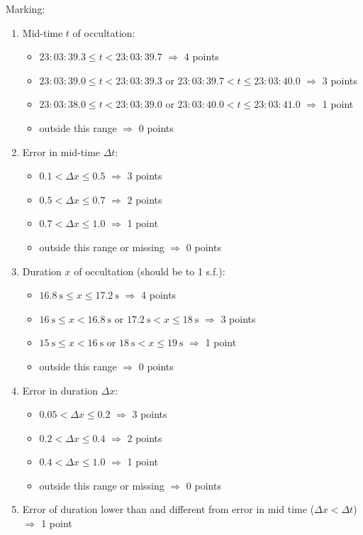 Marking:
\begin{enumerate}
\item Mid-time $t$ of occultation:
  \begin{itemize}
  \item $23{:}03{:}39.3 \le t < 23{:}03{:}39.7$ $\Longrightarrow$ 4 points
  \item $23{:}03{:}39.0 \le t < 23{:}03{:}39.3$ or
    $23{:}03{:}39.7 < t \le 23{:}03{:}40.0$ $\Longrightarrow$ 3 points
  \item $23{:}03{:}38.0 \le t < 23{:}03{:}39.0$ or
    $23{:}03{:}40.0 < t \le 23{:}03{:}41.0$ $\Longrightarrow$ 1 point
  \item outside this range $\Longrightarrow$ 0 points
  \end{itemize}
\item Error in mid-time $\Delta t$:
  \begin{itemize}
  \item $0.1 < \Delta x \le 0.5$ $\Longrightarrow$ 3 points
  \item $0.5 < \Delta x \le 0.7$ $\Longrightarrow$ 2 points
  \item $0.7 < \Delta x \le 1.0$ $\Longrightarrow$ 1 point
  \item outside this range or missing $\Longrightarrow$ 0 points
  \end{itemize}
\item Duration $x$ of occultation (should be to 1 s.f.):
  \begin{itemize}
  \item $16.8~\mathrm{s} \le x \le 17.2~\mathrm{s}$ $\Longrightarrow$ 4 points
  \item $16~\mathrm{s} \le x < 16.8~\mathrm{s}$ or
    $17.2~\mathrm{s} < x \le 18~\mathrm{s}$ $\Longrightarrow$ 3 points
  \item $15~\mathrm{s} \le x < 16~\mathrm{s}$ or
    $18~\mathrm{s} < x \le 19~\mathrm{s}$ $\Longrightarrow$ 1 point
  \item outside this range $\Longrightarrow$ 0 points
  \end{itemize}
\item Error in duration $\Delta x$:
  \begin{itemize}
  \item $0.05 < \Delta x \le 0.2$ $\Longrightarrow$ 3 points
  \item $0.2 < \Delta x \le 0.4$ $\Longrightarrow$ 2 points
  \item $0.4 < \Delta x \le 1.0$ $\Longrightarrow$ 1 point
  \item outside this range or missing $\Longrightarrow$ 0 points
  \end{itemize}
\item Error of duration lower than and different from error in mid time
  ($\Delta x < \Delta t$) $\Longrightarrow$ 1 point
\end{enumerate}

